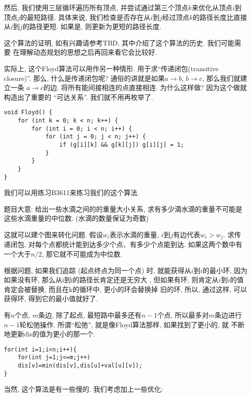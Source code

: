 然后, 我们使用三层循环遍历所有顶点, 并尝试通过第三个顶点$k$来优化从顶点$i$到顶点$j$的最短路径. 
具体来说, 我们检查是否存在从$i$到$j$经过顶点$k$的路径长度比直接从$i$到$j$的路径更短. 
如果是, 则更新为更短的路径长度. 

这个算法的证明, 如有兴趣请参考TBD, 其中介绍了这个算法的历史. 我们可能需要
在理解动态规划的思想之后再回来看它会比较好. 

实际上, 这个Floyd算法可以用作另一种情形. 用于求``传递闭包(transitive closure)''. 
那么, 什么是传递闭包呢? 通俗的讲就是如果$a\to b$,  $b\to c$, 那么我们就建立一条
$a\to c$的边. 将所有能间接相连的点直接相连. 为什么这样做? 因为这个做就构造出了重要的
``可达关系''. 我们就不用再枚举了. 

\begin{lstlisting}
void Floyd() {
    for (int k = 0; k < n; k++) {
        for (int i = 0; i < n; i++) {
            for (int j = 0; j < n; j++) {
                if (g[i][k] && g[k][j]) g[i][j] = 1;  
            }
        }
    }
}
\end{lstlisting}

 我们可以用练习B3611来练习我们的这个算法. 

题目大意: 给出一些水滴之间的的重量大小关系, 求有多少滴水滴的重量不可能是这些水滴重量的中位数.  (水滴的数量保证为奇数) 

这就可以建个图来转化问题. 假设$w_i$表示水滴的重量, $i$到$j$有边代表$w_i>w_j$. 
求传递闭包, 对每个点都统计能到达多少个点、有多少个点能到达. 
如果这两个数中有一个大于$n/2$, 那它就不可能成为中位数. 

 根据问题, 如果我们追踪 (起点终点为同一个点) 时, 
就能获得从$i$到$i$的最小环, 因为如果没有环, 那么从i到i的路径长肯定还是无穷大
, 但如果有环, 则肯定从$i$到$i$的值肯定会被替换, 而且在k的循环中, 更小的环会替换掉
旧的环, 所以, 通过这样, 可以获得环, 得到它的最小值就好了. 

 有$n$个点, $m$条边, 除了起点, 最短路中最多还有$n-1$个点, 
所以最多对$m$条边进行$n-1$轮松弛操作. 所谓``松弛'', 就是像Floyd算法那样, 如果找到了更小的, 就
不断地更新dis的值为更小的那一个. 
\begin{lstlisting}
for(int i=1;i<n;i++){
    for(int j=1;j<=m;j++)
    dis[v]=min(dis[v],dis[u]+val[u][v]);
}    
\end{lstlisting}

当然, 这个算法是有一些慢的. 我们考虑加上一些优化: 

